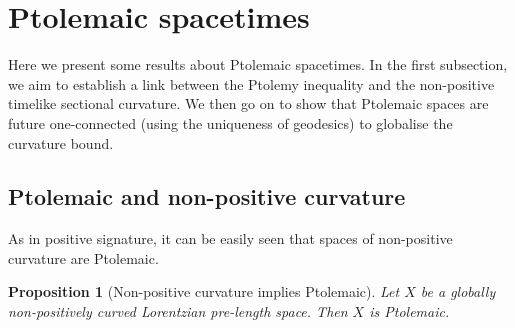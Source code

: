 \documentclass[hidelinks,12pt,a4paper]{article}
\numberwithin{equation}{section}
\theoremstyle{plain}
\newtheorem{proposition}[definition]{Proposition}
\theoremstyle{definition}
\newcommand{\LpLSn}{Lo\-rentz\-ian pre-length space}
\begin{document}
\section{Ptolemaic spacetimes}

Here we present some results about Ptolemaic spacetimes. 
In the first subsection, we aim to establish a link between the Ptolemy inequality and the non-positive timelike sectional curvature. 
We then go on to show that Ptolemaic spaces are future one-connected (using the uniqueness of geodesics) to globalise the curvature bound.

\subsection{Ptolemaic and non-positive curvature}

As in positive signature, it can be easily seen that spaces of non-positive curvature are Ptolemaic.

\begin{proposition}[Non-positive curvature implies Ptolemaic]
\label{prop: npc implies ptolemy}
Let $X$ be a globally non-positively curved \LpLSn. 
Then $X$ is Ptolemaic.
\end{proposition}
\end{document}
